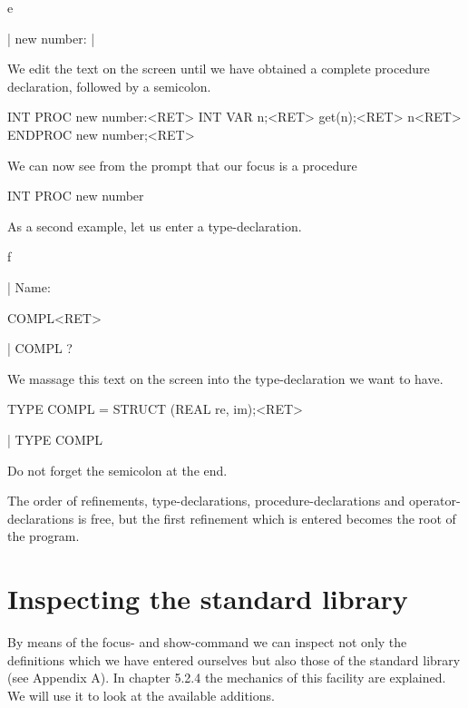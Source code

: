 \begin{elan}
        e

|       new number:
|       \cursor
\end{elan}

\noindent
We edit the text on the screen until we have obtained a complete
procedure declaration, followed by a semicolon.

\begin{elan}
        INT PROC new number:<RET>
          INT VAR n;<RET>
          get(n);<RET>
          n<RET>
        ENDPROC new number;<RET>
\end{elan}

\noindent
We can now see from the prompt that our focus is a procedure

\begin{elan}
        INT PROC new number\cursor
\end{elan}

As a second example, let us enter a type-declaration.

\begin{elan}
        f

|       Name:\cursor

        COMPL<RET>

|       COMPL ?\cursor
\end{elan}

\noindent
We massage this text on the screen into the type-declaration we
want to have.

\begin{elan}
        TYPE COMPL = STRUCT (REAL re, im);<RET>

|       TYPE COMPL\cursor
\end{elan}

\noindent
Do not forget the semicolon at the end.

The order of refinements, type-declarations, procedure-declarations
and operator-decla\-rations is free, but the first refinement which is
entered becomes the root of the program.

\section{Inspecting the standard library}

By means of the focus- and show-command we can inspect not only
the definitions which we have entered ourselves but also those of
the standard library (see Appendix A). In chapter 5.2.4 the
mechanics of this facility are explained. We will use it to look
at the available additions.


